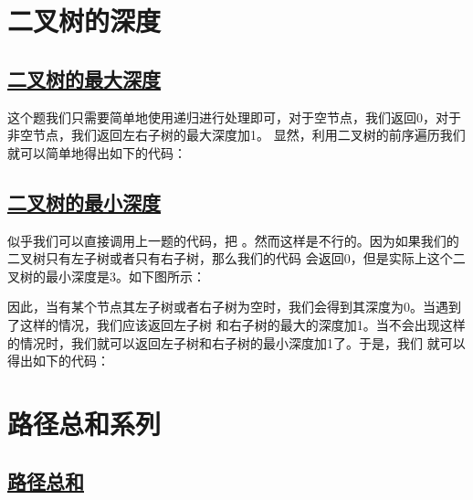 \documentclass[../../main.tex]{subfiles}
\begin{document}


\section{二叉树的深度}

\subsection{\href{https://leetcode.cn/problems/maximum-depth-of-binary-tree/}{二叉树的最大深度}}

这个题我们只需要简单地使用递归进行处理即可，对于空节点，我们返回0，对于非空节点，我们返回左右子树的最大深度加1。
显然，利用二叉树的前序遍历我们就可以简单地得出如下的代码：



\subsection{\href{https://leetcode-cn.com/problems/minimum-depth-of-binary-tree/}{二叉树的最小深度}}

似乎我们可以直接调用上一题的代码，把 。然而这样是不行的。因为如果我们的二叉树只有左子树或者只有右子树，那么我们的代码
会返回0，但是实际上这个二叉树的最小深度是3。如下图所示：


因此，当有某个节点其左子树或者右子树为空时，我们会得到其深度为0。当遇到了这样的情况，我们应该返回左子树
和右子树的最大的深度加1。当不会出现这样的情况时，我们就可以返回左子树和右子树的最小深度加1了。于是，我们
就可以得出如下的代码：



\section{路径总和系列}

\subsection{\href{https://leetcode.cn/problems/path-sum/}{路径总和}}
\end{document}
